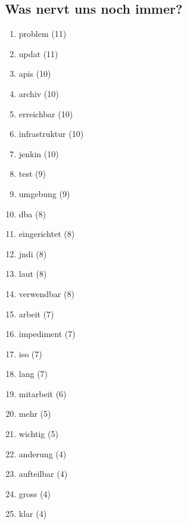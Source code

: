 \subsection*{Was nervt uns noch immer?}
\begin{enumerate}
    \item problem (11)
    \item updat (11)
    \item apis (10)
    \item archiv (10)
    \item erreichbar (10)
    \item infrastruktur (10)
    \item jenkin (10)
    \item test (9)
    \item umgebung (9)
    \item dba (8)
    \item eingerichtet (8)
    \item jndi (8)
    \item laut (8)
    \item verwendbar (8)
    \item arbeit (7)
    \item impediment (7)
    \item iso (7)
    \item lang (7)
    \item mitarbeit (6)
    \item mehr (5)
    \item wichtig (5)
    \item anderung (4)
    \item aufteilbar (4)
    \item gross (4)
    \item klar (4)
\end{enumerate}
